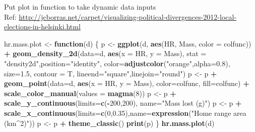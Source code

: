 \documentclass[10,portrait]{article}
\newenvironment{Shaded}{\begin{snugshade}}{\end{snugshade}}
\newcommand{\KeywordTok}[1]{\textcolor[rgb]{0.13,0.29,0.53}{\textbf{#1}}}
\newcommand{\DataTypeTok}[1]{\textcolor[rgb]{0.13,0.29,0.53}{#1}}
\newcommand{\DecValTok}[1]{\textcolor[rgb]{0.00,0.00,0.81}{#1}}
\newcommand{\FloatTok}[1]{\textcolor[rgb]{0.00,0.00,0.81}{#1}}
\newcommand{\StringTok}[1]{\textcolor[rgb]{0.31,0.60,0.02}{#1}}
\newcommand{\ControlFlowTok}[1]{\textcolor[rgb]{0.13,0.29,0.53}{\textbf{#1}}}
\newcommand{\OperatorTok}[1]{\textcolor[rgb]{0.81,0.36,0.00}{\textbf{#1}}}
\newcommand{\NormalTok}[1]{#1}
\begin{document}
Put plot in function to take dynamic data inputs\\
Ref:
\url{http://jcborras.net/carpet/visualizing-political-divergences-2012-local-elections-in-helsinki.html}

\begin{Shaded}
\begin{Highlighting}[]
\NormalTok{hr.mass.plot <-}\StringTok{ }\ControlFlowTok{function}\NormalTok{(d) \{}
\NormalTok{  p <-}\StringTok{ }\KeywordTok{ggplot}\NormalTok{(d, }\KeywordTok{aes}\NormalTok{(HR, Mass, }\DataTypeTok{color =}\NormalTok{ colfunc)) }\OperatorTok{+}\StringTok{ }
\StringTok{    }\KeywordTok{geom_density_2d}\NormalTok{(}\DataTypeTok{data=}\NormalTok{d, }\KeywordTok{aes}\NormalTok{(}\DataTypeTok{x =}\NormalTok{ HR, }\DataTypeTok{y =}\NormalTok{ Mass), }
                    \DataTypeTok{stat =} \StringTok{"density2d"}\NormalTok{,}\DataTypeTok{position=}\StringTok{"identity"}\NormalTok{, }
                    \DataTypeTok{color=}\KeywordTok{adjustcolor}\NormalTok{(}\StringTok{"orange"}\NormalTok{,}\DataTypeTok{alpha=}\FloatTok{0.8}\NormalTok{), }\DataTypeTok{size=}\FloatTok{1.5}\NormalTok{, }\DataTypeTok{contour =}\NormalTok{ T, }\DataTypeTok{lineend=}\StringTok{"square"}\NormalTok{,}\DataTypeTok{linejoin=}\StringTok{"round"}\NormalTok{) }
\NormalTok{  p <-}\StringTok{ }\NormalTok{p }\OperatorTok{+}\StringTok{ }\KeywordTok{geom_point}\NormalTok{(}\DataTypeTok{data=}\NormalTok{d, }\KeywordTok{aes}\NormalTok{(}\DataTypeTok{x =}\NormalTok{ HR, }\DataTypeTok{y =}\NormalTok{ Mass),}
                      \DataTypeTok{color=}\NormalTok{colfunc,}
                      \DataTypeTok{fill=}\NormalTok{colfunc) }\OperatorTok{+}
\StringTok{    }\KeywordTok{scale_color_manual}\NormalTok{(}\DataTypeTok{values =} \KeywordTok{magma}\NormalTok{(}\DecValTok{8}\NormalTok{))}
\NormalTok{  p <-}\StringTok{ }\NormalTok{p }\OperatorTok{+}\StringTok{ }\KeywordTok{scale_y_continuous}\NormalTok{(}\DataTypeTok{limits=}\KeywordTok{c}\NormalTok{(}\OperatorTok{-}\DecValTok{200}\NormalTok{,}\DecValTok{200}\NormalTok{), }\DataTypeTok{name=}\StringTok{"Mass lost (g)"}\NormalTok{) }
\NormalTok{  p <-}\StringTok{ }\NormalTok{p }\OperatorTok{+}\StringTok{ }\KeywordTok{scale_x_continuous}\NormalTok{(}\DataTypeTok{limits=}\KeywordTok{c}\NormalTok{(}\DecValTok{0}\NormalTok{,}\FloatTok{0.35}\NormalTok{),}\DataTypeTok{name=}\KeywordTok{expression}\NormalTok{(}\StringTok{"Home range area (km^2)"}\NormalTok{)) }
\NormalTok{  p <-}\StringTok{ }\NormalTok{p }\OperatorTok{+}\StringTok{ }\KeywordTok{theme_classic}\NormalTok{()}
  \KeywordTok{print}\NormalTok{(p)}
\NormalTok{\}}
\KeywordTok{hr.mass.plot}\NormalTok{(d)}
\end{Highlighting}
\end{Shaded}
\end{document}
